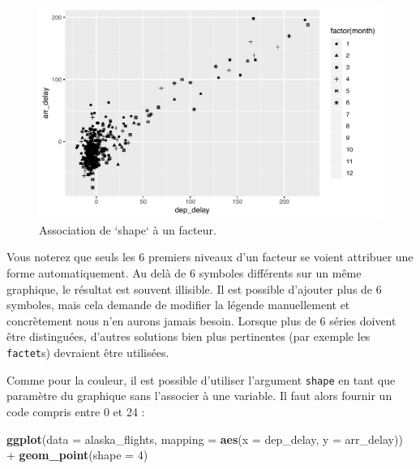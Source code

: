 \documentclass[a4paperpaper,]{article}
\newenvironment{Shaded}{\begin{snugshade}}{\end{snugshade}}
\newcommand{\DataTypeTok}[1]{\textcolor[rgb]{0.00,0.34,0.68}{#1}}
\newcommand{\DecValTok}[1]{\textcolor[rgb]{0.69,0.50,0.00}{#1}}
\newcommand{\KeywordTok}[1]{\textcolor[rgb]{0.12,0.11,0.11}{\textbf{#1}}}
\newcommand{\NormalTok}[1]{\textcolor[rgb]{0.12,0.11,0.11}{#1}}
\newcommand{\OperatorTok}[1]{\textcolor[rgb]{0.12,0.11,0.11}{#1}}
\newcommand{\StringTok}[1]{\textcolor[rgb]{0.75,0.01,0.01}{#1}}
\begin{document}
\begin{figure}[htpb]

{\centering \includegraphics[width=0.9\linewidth]{figure/shapeplot-1} 

}

\caption{Association de `shape` à un facteur.}\label{fig:shapeplot}
\end{figure}

Vous noterez que seuls les 6 premiers niveaux d'un facteur se voient attribuer une forme automatiquement. Au delà de 6 symboles différents sur un même graphique, le résultat est souvent illisible. Il est possible d'ajouter plus de 6 symboles, mais cela demande de modifier la légende manuellement et concrètement nous n'en aurons jamais besoin. Lorsque plus de 6 séries doivent être distinguées, d'autres solutions bien plus pertinentes (par exemple les \texttt{factet}s) devraient être utilisées.

Comme pour la couleur, il est possible d'utiliser l'argument \texttt{shape} en tant que paramètre du graphique sans l'associer à une variable. Il faut alors fournir un code compris entre 0 et 24 :

\begin{Shaded}
\begin{Highlighting}[]
\KeywordTok{ggplot}\NormalTok{(}\DataTypeTok{data =}\NormalTok{ alaska_flights, }\DataTypeTok{mapping =} \KeywordTok{aes}\NormalTok{(}\DataTypeTok{x =}\NormalTok{ dep_delay, }\DataTypeTok{y =}\NormalTok{ arr_delay)) }\OperatorTok{+}
\StringTok{  }\KeywordTok{geom_point}\NormalTok{(}\DataTypeTok{shape =} \DecValTok{4}\NormalTok{)}
\end{Highlighting}
\end{Shaded}
\end{document}
